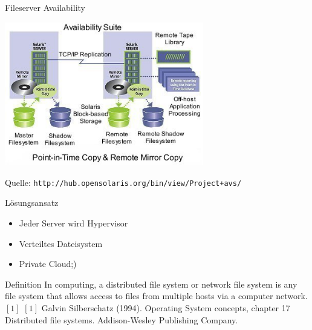 \documentclass[notes=hide,yellow]{beamer}
\begin{document}
\begin{frame}{Fileserver Availability}
	\begin{center}
	\includegraphics[width=0.65\textwidth]{availabilitysuitenew.jpg}
	\end{center}
	\small
	Quelle: \texttt{http://hub.opensolaris.org/bin/view/Project+avs/}
\end{frame}


\begin{frame}{L\"osungsansatz}
	
	\begin{itemize}
		\item Jeder Server wird Hypervisor
		\item Verteiltes Dateisystem 
		\item <2> \glqq Private Cloud\grqq ;)
	\end{itemize}

\end{frame}

\begin{frame}{Definition}
		In computing, a distributed file system or network file system is any file system that allows access to files from multiple hosts via a computer network.$[1]$
	\tiny{$[1]$ Galvin Silberschatz (1994). Operating System concepts, chapter 17 Distributed file systems. Addison-Wesley Publishing Company.} \\ 
\end{frame}
\end{document}
